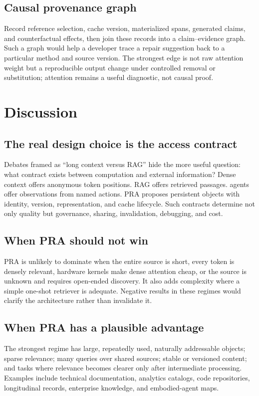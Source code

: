 \documentclass[10pt,a4paper]{article}
\begin{document}
\subsection{Causal provenance graph}
Record reference selection, cache version, materialized spans, generated claims, and
counterfactual effects, then join these records into a claim--evidence graph.  Such a
graph would help a developer trace a repair suggestion back to a particular method and
source version.  The strongest edge is not raw attention weight but a reproducible output
change under controlled removal or substitution; attention remains a useful diagnostic,
not causal proof.

\section{Discussion}
\subsection{The real design choice is the access contract}
Debates framed as ``long context versus RAG'' hide the more useful question: what contract exists between computation and external information? Dense context offers anonymous token positions. RAG offers retrieved passages. agents offer observations from named actions. PRA proposes persistent objects with identity, version, representation, and cache lifecycle. Such contracts determine not only quality but governance, sharing, invalidation, debugging, and cost.

\subsection{When PRA should not win}
PRA is unlikely to dominate when the entire source is short, every token is densely relevant, hardware kernels make dense attention cheap, or the source is unknown and requires open-ended discovery. It also adds complexity where a simple one-shot retriever is adequate. Negative results in these regimes would clarify the architecture rather than invalidate it.

\subsection{When PRA has a plausible advantage}
The strongest regime has large, repeatedly used, naturally addressable objects; sparse relevance; many queries over shared sources; stable or versioned content; and tasks where relevance becomes clearer only after intermediate processing. Examples include technical documentation, analytics catalogs, code repositories, longitudinal records, enterprise knowledge, and embodied-agent maps.
\end{document}
